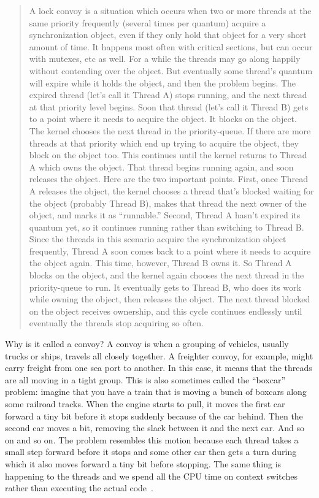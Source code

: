 \documentclass[a4paper]{report}
\begin{document}
\begin{quote}
A lock convoy is a situation which occurs when two or more threads at the same priority frequently (several times per quantum) acquire a synchronization object, even if they only hold that object for a very short amount of time.  It happens most often with critical sections, but can occur with mutexes, etc as well.  For a while the threads may go along happily without contending over the object.  But eventually some thread's quantum will expire while it holds the object, and then the problem begins.  The expired thread (let's call it Thread A) stops running, and the next thread at that priority level begins.  Soon that thread (let's call it Thread B) gets to a point where it needs to acquire the object.  It blocks on the object.  The kernel chooses the next thread in the priority-queue.  If there are more threads at that priority which end up trying to acquire the object, they block on the object too.  This continues until the kernel returns to Thread A which owns the object.  That thread begins running again, and soon releases the object.  Here are the two important points.  First, once Thread A releases the object, the kernel chooses a thread that's blocked waiting for the object (probably Thread B), makes that thread the next owner of the object, and marks it as ``runnable.''  Second, Thread A hasn't expired its quantum yet, so it continues running rather than switching to Thread B.  Since the threads in this scenario acquire the synchronization object frequently, Thread A soon comes back to a point where it needs to acquire the object again.  This time, however, Thread B owns it.  So Thread A blocks on the object, and the kernel again chooses the next thread in the priority-queue to run.  It eventually gets to Thread B, who does its work while owning the object, then releases the object.  The next thread blocked on the object receives ownership, and this cycle continues endlessly until eventually the threads stop acquiring so often.
\end{quote}

Why is it called a convoy? A convoy is when a grouping of vehicles, usually trucks or ships, travels all closely together. A freighter convoy, for example, might carry freight from one sea port to another. In this case, it means that the threads are all moving in a tight group. This is also sometimes called the ``boxcar'' problem: imagine that you have a train that is moving a bunch of boxcars along some railroad tracks. When the engine starts to pull, it moves the first car forward a tiny bit before it stops suddenly because of the car behind. Then the second car moves a bit, removing the slack between it and the next car. And so on and so on. The problem resembles this motion because each thread takes a small step forward before it stops and some other car then gets a turn during which it also moves forward a tiny bit before stopping. The same thing is happening to the threads and we spend all the CPU time on context switches rather than executing the actual code~\cite{boxcar}.
\end{document}
